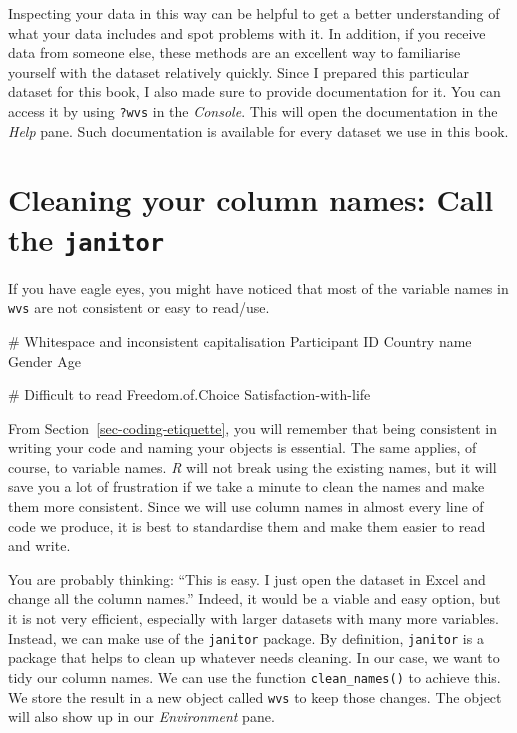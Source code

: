 \documentclass[
  letterpaper,
]{krantz}
\makeatletter
\newenvironment{Shaded}{\begin{snugshade}}{\end{snugshade}}
\newcommand{\CommentTok}[1]{\textcolor[rgb]{0.37,0.37,0.37}{#1}}
\newcommand{\NormalTok}[1]{\textcolor[rgb]{0.00,0.23,0.31}{#1}}
\newcommand{\SpecialCharTok}[1]{\textcolor[rgb]{0.37,0.37,0.37}{#1}}
\newenvironment{kframe}{%
\medskip{}
\setlength{\fboxsep}{.8em}
 \def\at@end@of@kframe{}%
 \ifinner\ifhmode%
  \def\at@end@of@kframe{\end{minipage}}%
  \begin{minipage}{\columnwidth}%
 \fi\fi%
 \def\FrameCommand##1{\hskip\@totalleftmargin \hskip-\fboxsep
 \colorbox{shadecolor}{##1}\hskip-\fboxsep
     \hskip-\linewidth \hskip-\@totalleftmargin \hskip\columnwidth}%
 \MakeFramed {\advance\hsize-\width
   \@totalleftmargin\z@ \linewidth\hsize
   \@setminipage}}%
 {\par\unskip\endMakeFramed%
 \at@end@of@kframe}
\renewenvironment{Shaded}{\begin{kframe}}{\end{kframe}}
\makeatother
\begin{document}
Inspecting your data in this way can be helpful to get a better
understanding of what your data includes and spot problems with it. In
addition, if you receive data from someone else, these methods are an
excellent way to familiarise yourself with the dataset relatively
quickly. Since I prepared this particular dataset for this book, I also
made sure to provide documentation for it. You can access it by using
\texttt{?wvs} in the \emph{Console}. This will open the documentation in
the \emph{Help} pane. Such documentation is available for every dataset
we use in this book.

\section{\texorpdfstring{Cleaning your column names: Call the
\texttt{janitor}}{Cleaning your column names: Call the janitor}}\label{sec-colnames-cleaning}

If you have eagle eyes, you might have noticed that most of the variable
names in \texttt{wvs} are not consistent or easy to read/use.

\label{messy_column_names}%
\begin{Shaded}
\begin{Highlighting}[]
\CommentTok{\# Whitespace and inconsistent capitalisation}
\NormalTok{Participant ID        }
\NormalTok{Country name          }
\NormalTok{Gender                }
\NormalTok{Age                   }

\CommentTok{\# Difficult to read}
\NormalTok{Freedom.of.Choice     }
\NormalTok{Satisfaction}\SpecialCharTok{{-}}\NormalTok{with}\SpecialCharTok{{-}}\NormalTok{life}
\end{Highlighting}
\end{Shaded}

From Section~\ref{sec-coding-etiquette}, you will remember that being
consistent in writing your code and naming your objects is essential.
The same applies, of course, to variable names. \emph{R} will not break
using the existing names, but it will save you a lot of frustration if
we take a minute to clean the names and make them more consistent. Since
we will use column names in almost every line of code we produce, it is
best to standardise them and make them easier to read and write.

You are probably thinking: ``This is easy. I just open the dataset in
Excel and change all the column names.'' Indeed, it would be a viable
and easy option, but it is not very efficient, especially with larger
datasets with many more variables. Instead, we can make use of the
\texttt{janitor} package. By definition, \texttt{janitor} is a package
that helps to clean up whatever needs cleaning. In our case, we want to
tidy our column names. We can use the function \texttt{clean\_names()}
to achieve this. We store the result in a new object called \texttt{wvs}
to keep those changes. The object will also show up in our
\emph{Environment} pane.
\end{document}
